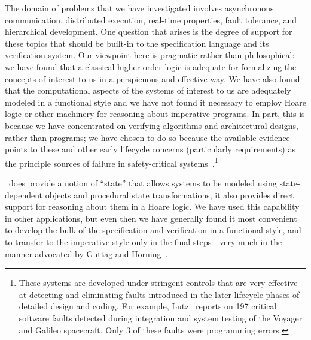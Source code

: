 The domain of problems that we have investigated involves
asynchronous communication, distributed execution, real-time
properties, fault tolerance, and hierarchical development.  One
question that arises is the degree of support for these topics that
should be built-in to the specification language and its verification
system.  Our viewpoint here is pragmatic rather than philosophical:
we have found that a classical higher-order logic is adequate for
formalizing the concepts of interest to us in a perspicuous and
effective way.  We have also found that the computational aspects of
the systems of interest to us are adequately modeled in a functional
style and we have not found it necessary to employ Hoare logic or
other machinery for reasoning about imperative programs.  In part,
this is because we have concentrated on verifying algorithms and
architectural designs, rather than programs; we have chosen to do so
because the available evidence points to these and other early
lifecycle concerns (particularly requirements) as the principle
sources of failure in safety-critical
systems~\cite{Rushby:FAA}.\footnote{These systems are developed under
stringent controls that are very effective at detecting and
eliminating faults introduced in the later lifecycle phases of
detailed design and coding.  For example, Lutz~\cite{Lutz93:rqts}
reports on 197 critical software faults detected during integration
and system testing of the Voyager and Galileo spacecraft.  Only 3 of
these faults were programming errors.}


\ehdm\ does provide a notion of ``state'' that allows systems to be
modeled using state-dependent objects and procedural state
transformations; it also provides direct support for reasoning about
them in a Hoare logic.  We have used this capability in other
applications, but even then we have generally found it most convenient to
develop the bulk of the specification and verification in a
functional style, and to transfer to the imperative style only in the
final steps---very much in the manner advocated by Guttag and
Horning~\cite{Guttag&Horning80}.

